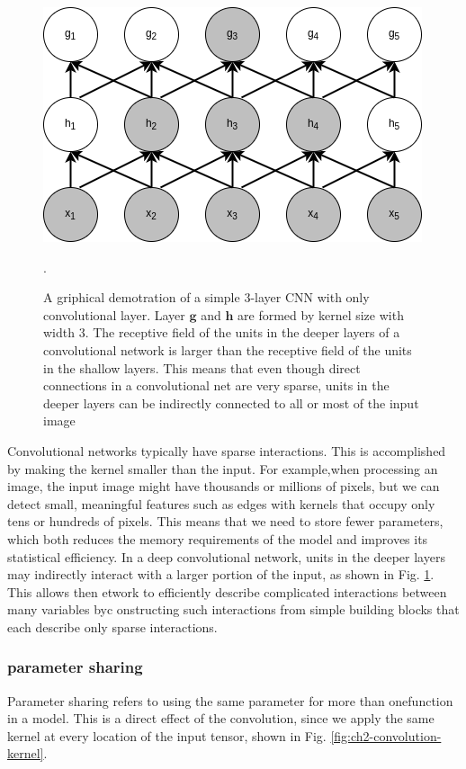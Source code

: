     \begin{figure}[htpb]
    	\centering
    	\includegraphics[width=0.5\columnwidth]{figures/ch2/receptive-field.png}
    	\caption{ A griphical demotration of a simple 3-layer CNN with only convolutional layer. Layer $\mathbf{g}$ and $\mathbf{h}$ are formed by kernel size with width 3. The receptive ﬁeld of the units in the deeper layers of a convolutional network is larger than the receptive ﬁeld of the units in the shallow layers. This means that even though direct connections in a convolutional net are very sparse, units in the deeper layers can be indirectly connected to all or most of the input image \cite{Goodfellow-et-al-2016}}.
    	\label{fig:ch2-sparse-connection}
    \end{figure}
    Convolutional networks typically have sparse interactions. This is accomplished by making the kernel smaller than the input. For example,when processing an image, the input image might have thousands or millions of pixels, but we can detect small, meaningful features such as edges with kernels that occupy only tens or hundreds of pixels. This means that we need to store fewer parameters, which both reduces the memory requirements of the model and improves its statistical efficiency. In a deep convolutional network, units in the deeper layers may indirectly interact with a larger portion of the input, as shown in Fig. \ref{fig:ch2-sparse-connection}. This allows then etwork to efficiently describe complicated interactions between many variables byc onstructing such interactions from simple building blocks that each describe only sparse interactions.
   
    \subsubsection{parameter sharing}
    Parameter sharing refers to using the same parameter for more than onefunction in a model. This is a direct effect of the convolution, since we apply the same kernel at every location of the input tensor, shown in Fig. \ref{fig:ch2-convolution-kernel}.
    
